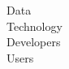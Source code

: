 \documentclass[../report.tex]{subfiles}
\begin{document}
Data \\

Technology \\

Developers \\

Users
\end{document}
